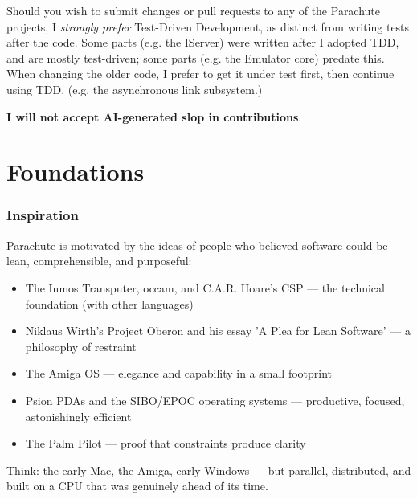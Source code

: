 \documentclass[a4paper]{tufte-book}
\begin{document}
\vspace{5mm}

Should you wish to submit changes or pull requests to any of the Parachute projects, I \textit{strongly prefer} Test-Driven Development, as distinct from writing tests after the code. Some parts (e.g. the IServer) were written after I adopted TDD, and are mostly test-driven; some parts (e.g. the Emulator core) predate this. When changing the older code, I prefer to get it under test first, then continue using TDD. (e.g. the asynchronous link subsystem.)

\vspace{5mm}

\textbf{I will not accept AI-generated slop in contributions}.

\vfill



\pagebreak
\part{Foundations}
\label{foundations}

\section{Inspiration}

Parachute is motivated by the ideas of people who believed software could be lean, comprehensible, and purposeful:
\begin{itemize}
	\item The Inmos Transputer, occam, and C.A.R. Hoare's CSP — the technical foundation (with other languages)
	\item Niklaus Wirth's Project Oberon and his essay 'A Plea for Lean Software' — a philosophy of restraint
	\item The Amiga OS — elegance and capability in a small footprint
	\item Psion PDAs and the SIBO/EPOC operating systems — productive, focused, astonishingly efficient
	\item The Palm Pilot — proof that constraints produce clarity
\end{itemize}

Think: the early Mac, the Amiga, early Windows — but parallel, distributed, and built on a CPU that was genuinely ahead of its time.
	
\end{document}
